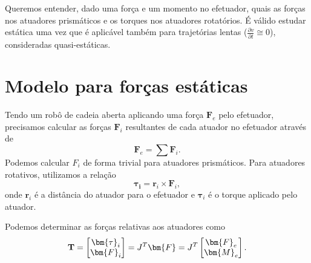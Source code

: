 
Queremos entender, dado uma força e um momento no efetuador, quais as forças nos atuadores prismáticos e os torques nos atuadores rotatórios. É válido estudar estática uma vez que é aplicável também para trajetórias lentas ($\frac{\partial v}{\partial t} \cong 0$), consideradas quasi-estáticas.

\section*{Modelo para forças estáticas}

Tendo um robô de cadeia aberta aplicando uma força $\bm{F}_e$ pelo efetuador, precisamos calcular as forças $\bm{F}_i$ resultantes de cada atuador no efetuador através de \[
\bm{F}_e = \sum \bm{F}_i
.\] Podemos calcular $F_i$ de forma trivial para atuadores prismáticos. Para atuadores rotativos, utilizamos a relação \[
\bm{\tau_i} = \bm{r}_i \times \bm{F}_i
,\] onde $\bm{r}_i$ é a distância do atuador para o efetuador e $\bm{\tau}_i$ é o torque aplicado pelo atuador.

Podemos determinar as forças relativas aos atuadores como \[
    \text{\textbf{T}} = \begin{bmatrix} \bm{\tau}_i \\ \bm{F}_i \end{bmatrix} = J^{T} \bm{F} = J^{T} \begin{bmatrix} \bm{F}_e \\ \bm{M}_e \end{bmatrix} 
.\] 

